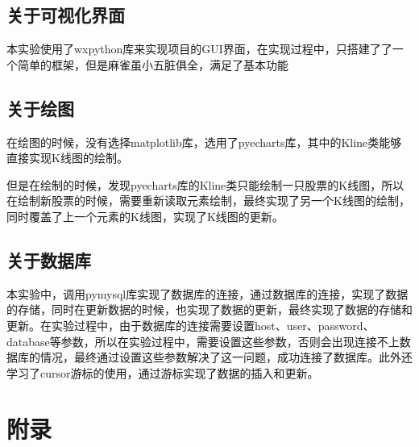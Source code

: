 \documentclass[UTF8,12pt]{article}
\begin{document}
\subsection{关于可视化界面}
本实验使用了wxpython库来实现项目的GUI界面，在实现过程中，只搭建了了一个简单的框架，但是麻雀虽小五脏俱全，满足了基本功能

\subsection{关于绘图}
在绘图的时候，没有选择matplotlib库，选用了pyecharts库，其中的Kline类能够直接实现K线图的绘制。

但是在绘制的时候，发现pyecharts库的Kline类只能绘制一只股票的K线图，所以在绘制新股票的时候，需要重新读取元素绘制，最终实现了另一个K线图的绘制，同时覆盖了上一个元素的K线图，实现了K线图的更新。

\subsection{关于数据库}
本实验中，调用pymysql库实现了数据库的连接，通过数据库的连接，实现了数据的存储，同时在更新数据的时候，也实现了数据的更新，最终实现了数据的存储和更新。在实验过程中，由于数据库的连接需要设置host、user、password、database等参数，所以在实验过程中，需要设置这些参数，否则会出现连接不上数据库的情况，最终通过设置这些参数解决了这一问题，成功连接了数据库。此外还学习了cursor游标的使用，通过游标实现了数据的插入和更新。

\section{附录}
\end{document}

